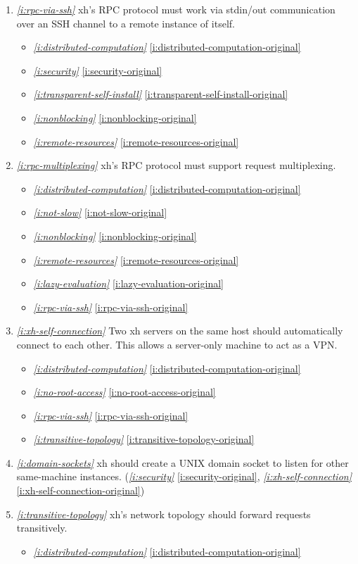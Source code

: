 \documentclass{report}
\makeatletter
\newcommand*{\Label}[2]{%
  \@bsphack
  \begingroup
    \label{#1-original}%
    \def\@currentlabel{#2}%
    \label{#1}%
  \endgroup
  \@esphack
}
\newcommand{\refboth}[1]{{\em \ref{#1}} \ref{#1-original}}
\makeatother
\begin{document}
\begin{enumerate}
\item{}\Label{i:rpc-via-ssh}{sshrpc}{\em\ref{i:rpc-via-ssh}}
  xh's RPC protocol must work via stdin/out communication over an SSH
  channel to a remote instance of itself.
\begin{itemize}
\item \refboth{i:distributed-computation}
\item \refboth{i:security}
\item \refboth{i:transparent-self-install}
\item \refboth{i:nonblocking}
\item \refboth{i:remote-resources}
\end{itemize}
\item{}\Label{i:rpc-multiplexing}{rpcmulti}{\em\ref{i:rpc-multiplexing}}
  xh's RPC protocol must support request multiplexing.
\begin{itemize}
\item \refboth{i:distributed-computation}
\item \refboth{i:not-slow}
\item \refboth{i:nonblocking}
\item \refboth{i:remote-resources}
\item \refboth{i:lazy-evaluation}
\item \refboth{i:rpc-via-ssh}
\end{itemize}
\item{}\Label{i:xh-self-connection}{hostswitch}{\em\ref{i:xh-self-connection}}
  Two xh servers on the same host should automatically connect to each
  other. This allows a server-only machine to act as a VPN.
\begin{itemize}
\item \refboth{i:distributed-computation}
\item \refboth{i:no-root-access}
\item \refboth{i:rpc-via-ssh}
\item \refboth{i:transitive-topology}
\end{itemize}
\item{}\Label{i:domain-sockets}{domainsockets}{\em\ref{i:domain-sockets}}
  xh should create a UNIX domain socket to listen for other same-machine
  instances.
(\refboth{i:security}, \refboth{i:xh-self-connection})
\item{}\Label{i:transitive-topology}{transitive}{\em\ref{i:transitive-topology}}
  xh's network topology should forward requests transitively.
\begin{itemize}
\item \refboth{i:distributed-computation}

\end{itemize}
\end{enumerate}
\end{document}
